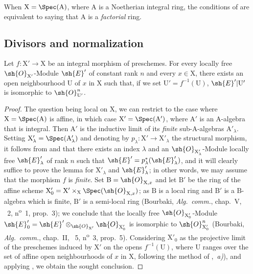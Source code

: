 \begin{remark}[21.7.7]
\label{IV.21.7.7}
When $\mathrm{X}=\Spec(\mathrm{A})$, where $\mathrm{A}$ is a Noetherian integral ring, the conditions of  are equivalent to saying that $\mathrm{A}$ is a \emph{factorial} ring.
\end{remark}


\subsection{Divisors and normalization}
\label{subsection:IV.21.8}

\begin{lemma}[21.8.1]
\label{IV.21.8.1}
Let $f:\mathrm{X}'\to\mathrm{X}$ be an integral morphism of preschemes.
For every locally free $\sh{O}_{\mathrm{X}'}$-Module $\sh{E}'$ of constant rank $n$ and every $x\in\mathrm{X}$, there exists an open neighbourhood $\mathrm{U}$ of $x$ in $\mathrm{X}$ such that, if we set $\mathrm{U}'=f^{-1}(\mathrm{U})$, $\sh{E}'|\mathrm{U}'$ is isomorphic to $\sh{O}_{\mathrm{U}'}^n$.
\end{lemma}

\begin{proof}
The question being local on $\mathrm{X}$, we can restrict to the case where $\mathrm{X}=\Spec(\mathrm{A})$ is affine, in which case $\mathrm{X}'=\Spec(\mathrm{A}')$, where $\mathrm{A}'$ is an $\mathrm{A}$-algebra that is integral.
Then $\mathrm{A}'$ is the inductive limit of its \emph{finite} sub-$\mathrm{A}$-algebras $\mathrm{A}'_\lambda$.
Setting $\mathrm{X}'_\lambda=\Spec(\mathrm{A}'_\lambda)$ and denoting by $p_\lambda:\mathrm{X}'\to\mathrm{X}'_\lambda$ the structural morphism, it follows from  and  that there exists an index $\lambda$ and an $\sh{O}_{\mathrm{X}'_\lambda}$-Module locally free $\sh{E}'_\lambda$ of rank $n$ such that $\sh{E}'=p_\lambda^*(\sh{E}'_\lambda)$, and it will clearly suffice to prove the lemma for $\mathrm{X}'_\lambda$ and $\sh{E}'_\lambda$;
in other words, we may assume that the morphism $f$ is \emph{finite}.
Set $\mathrm{B}=\sh{O}_{\mathrm{X},x}$ and let $\mathrm{B}'$ be the ring of the affine scheme $\mathrm{X}'_0=\mathrm{X}'\times_\mathrm{X}\Spec(\sh{O}_{\mathrm{X},x})$;
as $\mathrm{B}$ is a local ring and $\mathrm{B}'$ is a $\mathrm{B}$-algebra which is finite, $\mathrm{B}'$ is a semi-local ring (Bourbaki, \emph{Alg.\ comm.}, chap.~V, \textsection~2, n\textsuperscript{o}~1, prop.~3);
we conclude that the locally free $\sh{O}_{\mathrm{X}'_0}$-Module $\sh{E}'_0=\sh{E}'\otimes_{\sh{O}_{\mathrm{X}'}}\sh{O}_{\mathrm{X}'_0}$ is isomorphic to $\sh{O}_{\mathrm{X}'_0}^n$ (Bourbaki, \emph{Alg.\ comm.}, chap.~II, \textsection~5, n\textsuperscript{o}~3, prop.~5).
Considering $\mathrm{X}'_0$ as the
projective limit of the preschemes induced by $\mathrm{X}'$ on the opens $f^{-1}(\mathrm{U})$, where $\mathrm{U}$ ranges over the set of affine open neighbourhoods of $x$ in $\mathrm{X}$, following the method of ,{}~\emph{a)}), and applying , we obtain the sought conclusion.
\end{proof}

